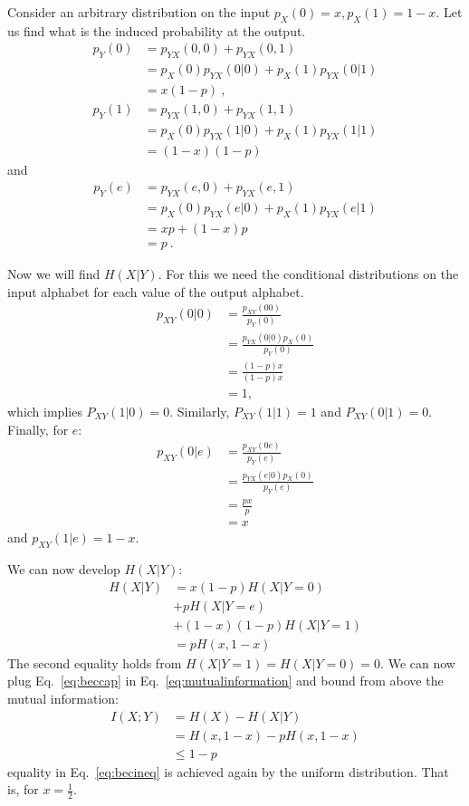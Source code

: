 \begin{solution}

Consider an arbitrary distribution on the input $p_X(0)=x,p_X(1)=1-x$. Let us find what is the induced probability at the output. 
\begin{align}
p_Y(0)&=p_{YX}(0,0)+p_{YX}(0,1)\\
      &=p_{X}(0)p_{YX}(0|0)+p_{X}(1)p_{YX}(0|1)\\
      &=x(1-p)\ ,
\end{align}
\begin{align}
p_Y(1)&=p_{YX}(1,0)+p_{YX}(1,1)\\
      &=p_{X}(0)p_{YX}(1|0)+p_{X}(1)p_{YX}(1|1)\\
      &=(1-x)(1-p)
\end{align}
and
\begin{align}
p_Y(e)&=p_{YX}(e,0)+p_{YX}(e,1)\\
      &=p_{X}(0)p_{YX}(e|0)+p_{X}(1)p_{YX}(e|1)\\
      &=xp+(1-x)p\\
      &=p\ .
\end{align}

Now we will find $H(X|Y)$. For this we need the conditional distributions on the input alphabet for each value of the output alphabet.  
\begin{align}
p_{XY}(0|0)&=\frac{p_{XY}(00)}{p_Y(0)}\\
           &=\frac{p_{YX}(0|0)p_X(0)}{p_Y(0)}\\
           &=\frac{(1-p)x}{(1-p)x}\\
           &= 1, 
\end{align}
which implies $P_{XY}(1|0)=0$. Similarly, $P_{XY}(1|1)=1$ and $P_{XY}(0|1)=0$. Finally, for $e$:
\begin{align}
p_{XY}(0|e)&=\frac{p_{XY}(0e)}{p_Y(e)}\\
           &=\frac{p_{YX}(e|0)p_X(0)}{p_Y(e)}\\
           &=\frac{px}{p}\\
           &= x 
\end{align}
and $p_{XY}(1|e)=1-x$.

We can now develop $H(X|Y)$:
\begin{align}
\label{eq:beccap}
H(X|Y) &= x(1-p )H(X|Y=0) \nonumber\\
           & + p H(X|Y=e)\nonumber\\
           & + (1-x)(1-p)H(X|Y=1) \\
           &=pH(x,1-x)
\end{align}
\noindent The second equality holds from $H(X|Y=1)=H(X|Y=0)=0$. We can now plug Eq.~\ref{eq:beccap} in Eq.~\ref{eq:mutualinformation} and bound from above the mutual information:
\begin{align}
I(X;Y) &= H(X) - H(X|Y) \\
         &= H(x, 1-x) - pH(x, 1-x)\\
         & \leq  1 - p\label{eq:becineq}
\end{align}
\noindent equality in Eq.~\ref{eq:becineq} is achieved again by the uniform distribution. That is, for $x=\frac{1}{2}$.
\end{solution}
